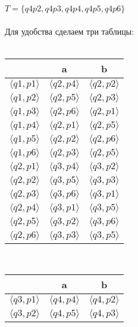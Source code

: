 \documentclass{article}
\begin{document}
\begin{enumerate}
    $T = \{q4p2, q4p3, q4p4, q4p5, q4p6\}$ \\ \\
    Для удобства сделаем три таблицы: \\ \\
    \begin{tabular}{|c|c|c|}
        \hline
                              & a                         & b     \\ \hline
         $\langle q1,p1 \rangle$    & $\langle q2,p4 \rangle$   & $\langle q2,p2 \rangle$    \\
         $\langle q1,p2 \rangle$    & $\langle q2,p5 \rangle$   & $\langle q2,p3 \rangle$    \\ 
         $\langle q1,p3 \rangle$    & $\langle q2,p6 \rangle$   & $\langle q2,p1 \rangle$    \\
         $\langle q1,p4 \rangle$    & $\langle q2,p1 \rangle$   & $\langle q2,p5 \rangle$    \\ 
         $\langle q1,p5 \rangle$    & $\langle q2,p2 \rangle$   & $\langle q2,p6 \rangle$    \\
         $\langle q1,p6 \rangle$    & $\langle q2,p3 \rangle$   & $\langle q2,p5 \rangle$    \\  \hline
         $\langle q2,p1 \rangle$    & $\langle q3,p4 \rangle$   & $\langle q3,p2 \rangle$    \\
         $\langle q2,p2 \rangle$    & $\langle q3,p5 \rangle$   & $\langle q3,p3 \rangle$    \\ 
         $\langle q2,p3 \rangle$    & $\langle q3,p6 \rangle$   & $\langle q3,p1 \rangle$    \\
         $\langle q2,p4 \rangle$    & $\langle q3,p1 \rangle$   & $\langle q3,p5 \rangle$    \\ 
         $\langle q2,p5 \rangle$    & $\langle q3,p2 \rangle$   & $\langle q3,p6 \rangle$    \\
         $\langle q2,p6 \rangle$    & $\langle q3,p3 \rangle$   & $\langle q3,p5 \rangle$    \\  \hline
    \end{tabular} \
    \begin{tabular}{|c|c|c|}
        \hline
                              & a                         & b     \\ \hline
         $\langle q3,p1 \rangle$    & $\langle q4,p4 \rangle$   & $\langle q4,p2 \rangle$    \\
         $\langle q3,p2 \rangle$    & $\langle q4,p5 \rangle$   & $\langle q4,p3 \rangle$    \\ 

\end{tabular}
\end{enumerate}
\end{document}
